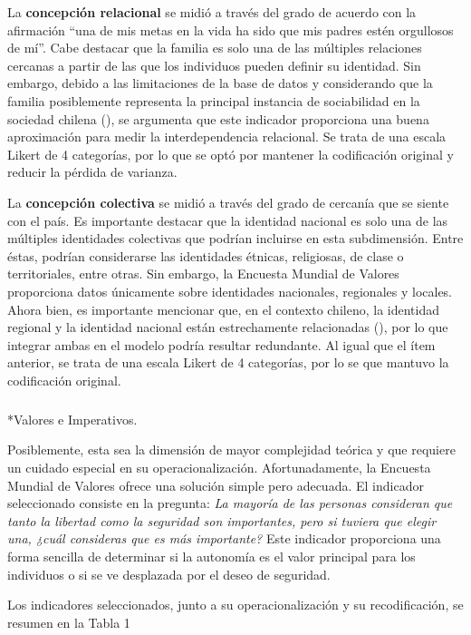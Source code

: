 \documentclass[
  letterpaper,
  DIV=11,
  numbers=noendperiod]{scrartcl}
\makeatletter
\let\oldsubparagraph\subparagraph
\renewcommand{\subparagraph}{
    \@ifstar
      \xxxSubParagraphStar
      \xxxSubParagraphNoStar
  }
\newcommand{\xxxSubParagraphStar}[1]{\oldsubparagraph*{#1}\mbox{}}
\newcommand{\xxxSubParagraphNoStar}[1]{\oldsubparagraph{#1}\mbox{}}
\makeatother
\begin{document}
La \textbf{concepción relacional} se midió a través del grado de acuerdo
con la afirmación ``una de mis metas en la vida ha sido que mis padres
estén orgullosos de mí''. Cabe destacar que la familia es solo una de
las múltiples relaciones cercanas a partir de las que los individuos
pueden definir su identidad. Sin embargo, debido a las limitaciones de
la base de datos y considerando que la familia posiblemente representa
la principal instancia de sociabilidad en la sociedad chilena
(), se argumenta que
este indicador proporciona una buena aproximación para medir la
interdependencia relacional. Se trata de una escala Likert de 4
categorías, por lo que se optó por mantener la codificación original y
reducir la pérdida de varianza.

La \textbf{concepción colectiva} se midió a través del grado de cercanía
que se siente con el país. Es importante destacar que la identidad
nacional es solo una de las múltiples identidades colectivas que podrían
incluirse en esta subdimensión. Entre éstas, podrían considerarse las
identidades étnicas, religiosas, de clase o territoriales, entre otras.
Sin embargo, la Encuesta Mundial de Valores proporciona datos únicamente
sobre identidades nacionales, regionales y locales. Ahora bien, es
importante mencionar que, en el contexto chileno, la identidad regional
y la identidad nacional están estrechamente relacionadas
(), por lo que integrar
ambas en el modelo podría resultar redundante. Al igual que el ítem
anterior, se trata de una escala Likert de 4 categorías, por lo se que
mantuvo la codificación original.

\subparagraph*{Valores e Imperativos.}\label{valores-e-imperativos.}

Posiblemente, esta sea la dimensión de mayor complejidad teórica y que
requiere un cuidado especial en su operacionalización. Afortunadamente,
la Encuesta Mundial de Valores ofrece una solución simple pero adecuada.
El indicador seleccionado consiste en la pregunta: \emph{La mayoría de
las personas consideran que tanto la libertad como la seguridad son
importantes, pero si tuviera que elegir una, ¿cuál consideras que es más
importante?} Este indicador proporciona una forma sencilla de determinar
si la autonomía es el valor principal para los individuos o si se ve
desplazada por el deseo de seguridad.

Los indicadores seleccionados, junto a su operacionalización y su
recodificación, se resumen en la Tabla 1
\end{document}
